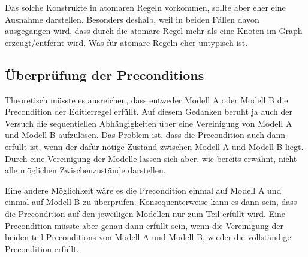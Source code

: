 Das solche Konstrukte in atomaren Regeln vorkommen, sollte aber eher eine Ausnahme darstellen.
Besonders deshalb, weil in beiden Fällen davon ausgegangen wird, dass durch die atomare Regel mehr
als eine Knoten im Graph erzeugt/entfernt wird. Was für atomare Regeln eher untypisch ist.

\subsection{Überprüfung der Preconditions}

Theoretisch müsste es ausreichen, dass entweder Modell A oder Modell B die Precondition der
Editierregel erfüllt. Auf diesem Gedanken beruht ja auch der Versuch die sequentiellen
Abhängigkeiten über eine Vereinigung von Modell A und Modell B aufzulösen. Das Problem ist, dass die
Precondition auch dann erfüllt ist, wenn der dafür nötige Zustand zwischen Modell A und Modell B
liegt. Durch eine Vereinigung der Modelle lassen sich aber, wie bereits erwähnt, nicht alle
möglichen Zwischenzustände darstellen.

Eine andere Möglichkeit wäre es die Precondition einmal auf Modell A und einmal auf Modell B zu
überprüfen. Konsequenterweise kann es dann sein, dass die Precondition auf den jeweiligen Modellen
nur zum Teil erfüllt wird. Eine Precondition müsste aber genau dann erfüllt sein, wenn die
Vereinigung der beiden teil Preconditions von Modell A und Modell B, wieder die vollständige
Precondition erfüllt.

% 
% 

% 


